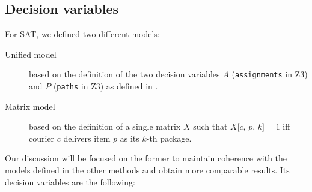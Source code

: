 



\subsection{Decision variables}

For SAT, we defined two different models:
\begin{description}
    \item[Unified model] based on the definition of the two decision variables $A$ (\texttt{assignments} in Z3) and $P$ (\texttt{paths} in Z3) as defined in .

    \item[Matrix model] based on the definition of a single matrix $X$ such that $X\texttt{[$c$, $p$, $k$]} = 1$ iff courier $c$ delivers item $p$ as its $k$-th package.
\end{description}

Our discussion will be focused on the former to maintain coherence with the models defined in the other methods and obtain more comparable results. Its decision variables are the following:

